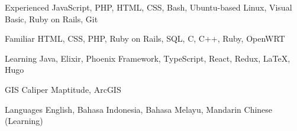 

\begin{cvskills}

  \cvskill
    {Experienced} %
    {JavaScript, PHP, HTML, CSS, Bash, Ubuntu-based Linux, Visual Basic, Ruby on Rails, Git} %

  \cvskill
    {Familiar} %
    {HTML, CSS, PHP, Ruby on Rails, SQL, C, C++, Ruby, OpenWRT} %
    
  \cvskill
    {Learning} %
    {Java, Elixir, Phoenix Framework, TypeScript, React, Redux, \LaTeX, Hugo} %
    
  \cvskill
    {GIS} %
    {Caliper Maptitude, ArcGIS} %

  \cvskill
    {Languages} %
    {English, Bahasa Indonesia, Bahasa Melayu, Mandarin Chinese (Learning)} %

\end{cvskills}
